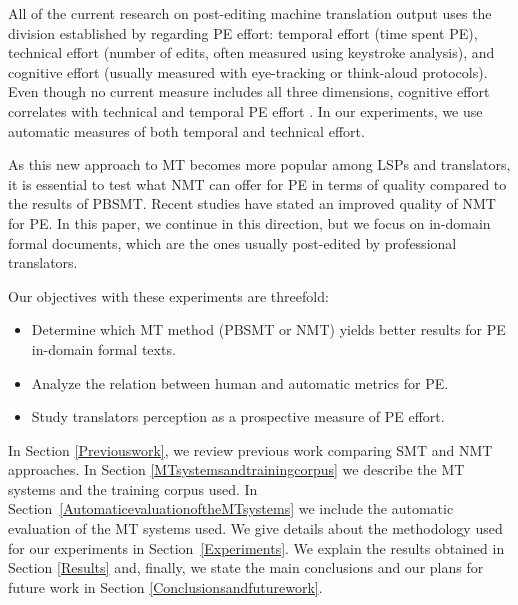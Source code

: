 \documentclass[output=paper]{langsci/langscibook}
\begin{document}
All of the current research on post-editing machine translation output uses the division established by \citet{krings2001repairing} regarding PE effort:  temporal effort (time spent PE), technical effort (number of edits, often measured using keystroke analysis), and cognitive effort (usually measured with eye-tracking or think-aloud protocols). Even though no current measure includes all three dimensions, cognitive effort correlates with technical and temporal PE effort \citep{moorkens_correlations_2015}. In our experiments, we use automatic measures of both temporal and technical effort.

As this new approach to MT becomes more popular among LSPs and translators, it is essential to test what NMT can offer for PE in terms of quality compared to the results of PBSMT. Recent studies \citep{Bentivogli2016,Castillo2017,Toral2017} have stated an improved quality of NMT for PE. In this paper, we continue in this direction, but we focus on in-domain formal documents, which are the ones usually post-edited by professional translators. 


Our objectives with these experiments are threefold:
\begin{itemize}
\item Determine which MT method (PBSMT or NMT) yields better results for PE in-domain formal texts.
\item Analyze the relation between human and automatic metrics for PE.
\item Study translators perception as a prospective measure of PE effort.
\end{itemize}

In Section \ref{Previouswork}, we review previous work comparing SMT and NMT approaches. In Section \ref{MTsystemsandtrainingcorpus} we describe the MT systems and the training corpus used. In Section~\ref{AutomaticevaluationoftheMTsystems} we include the automatic evaluation of the MT systems used. We give details about the methodology used for our experiments in Section~\ref{Experiments}. We explain the results obtained in Section \ref{Results} and, finally, we state the main conclusions and our plans for future work in Section \ref{Conclusionsandfuturework}.
\end{document}
